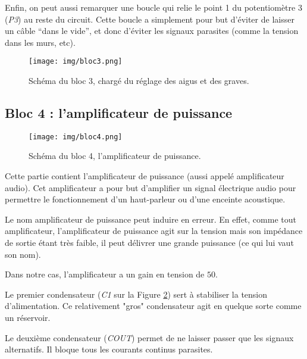 Enfin, on peut aussi remarquer une boucle qui relie le point 1 du potentiomètre 3 (\textit{P3}) au reste du circuit. Cette boucle a simplement pour but d'éviter de laisser un câble "`dans le vide"', et donc d'éviter les signaux parasites (comme la tension dans les murs, etc).

\begin{figure}[h]
	\centering
	\texttt{[image: img/bloc3.png]}
	\caption{Schéma du bloc 3, chargé du réglage des aigus et des graves.}
	\label{bloc3}
\end{figure}

\subsection{Bloc 4 : l'amplificateur de puissance}

\begin{figure}[h]
	\centering
	\texttt{[image: img/bloc4.png]}
	\caption{Schéma du bloc 4, l'amplificateur de puissance.}
	\label{bloc4}
\end{figure}

Cette partie contient l'amplificateur de puissance (aussi appelé amplificateur audio). 
Cet amplificateur a pour but d'amplifier un signal électrique audio pour
permettre le fonctionnement d'un haut-parleur ou d'une enceinte acoustique.

Le nom amplificateur de puissance peut induire en erreur. En effet, comme tout amplificateur,
l'amplificateur de puissance agit sur la tension mais son impédance de sortie étant très faible,
il peut délivrer une grande puissance (ce qui lui vaut son nom).

Dans notre cas, l'amplificateur a un gain en tension de $50$.

Le premier condensateur (\textit{C1} sur la Figure \ref{bloc4}) sert à stabiliser la tension d'alimentation. Ce relativement "gros" condensateur
agit en quelque sorte comme un réservoir.

Le deuxième condensateur (\textit{COUT}) permet de ne laisser passer que les signaux alternatifs. Il bloque tous les courants continus parasites.


